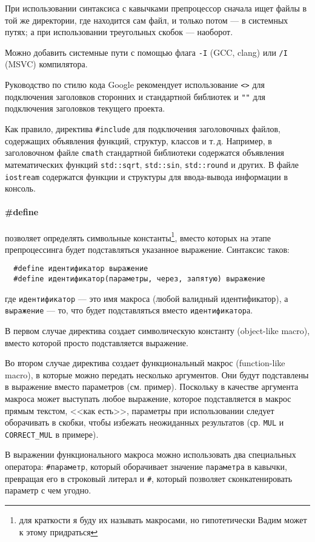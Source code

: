 \documentclass[14pt, a4paper]{extarticle}
\begin{document}
При использовании синтаксиса с кавычками препроцессор сначала ищет файлы в той же директории,
где находится сам файл, и только потом --- в системных путях; а при использовании треугольных скобок --- наоборот.

{\small Можно добавить системные пути с помощью флага \verb|-I| (GCC, clang) или \verb|/I| (MSVC) компилятора. }

Руководство по стилю кода Google рекомендует использование \verb|<>| для подключения заголовков сторонних и стандартной
библиотек и \verb|""| для подключения заголовков текущего проекта.

Как правило, директива \verb|#include| для подключения заголовочных файлов, содержащих
объявления функций, структур, классов и т.\,д. Например, в заголовочном файле \verb|cmath|
стандартной библиотеки содержатся объявления математических функций \verb|std::sqrt|, \verb|std::sin|,
\verb|std::round| и других. В файле \verb|iostream| содержатся функции и структуры для ввода-вывода информации
в консоль.

\paragraph{\#define} позволяет определять символьные константы\footnote{для краткости я буду их называть макросами,
но гипотетически Вадим может к этому придраться}, вместо которых на этапе препроцессинга
будет подставляться указанное выражение.
Синтаксис таков:
\begin{verbatim}
  #define идентификатор выражение
  #define идентификатор(параметры, через, запятую) выражение
\end{verbatim}
где \verb|идентификатор| --- это имя макроса (любой валидный идентификатор),
а \verb|выражение| --- то, что будет подставляться вместо \verb|идентификатор|а.

В первом случае директива создает символическую константу (object-like macro),
вместо которой просто подставляется выражение.

Во втором случае директива создает функциональный макрос (function-like macro),
в которые можно передать несколько аргументов. Они будут подставлены в выражение
вместо параметров (см. пример). Поскольку в качестве аргумента макроса может
выступать любое выражение, которое подставляется в макрос прямым текстом, <<как есть>>,
параметры при использовании следует оборачивать в скобки, чтобы избежать неожиданных результатов
(ср. \verb|MUL| и \verb|CORRECT_MUL| в примере).

В выражении функционального макроса можно использовать два специальных оператора:
\verb|#параметр|, который оборачивает значение \verb|параметра| в кавычки,
превращая его в строковый литерал и \verb|#|, который позволяет сконкатенировать
параметр с чем угодно.
\end{document}
